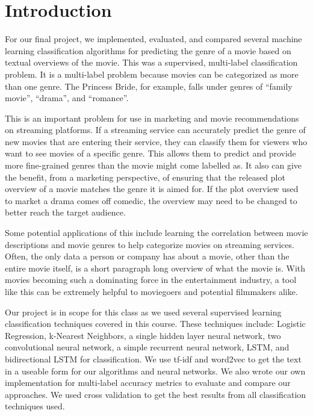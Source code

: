 \documentclass[sigconf]{acmart}
\begin{document}
%
\maketitle

\section{Introduction}
For our final project, we implemented, evaluated, and compared several machine learning classification algorithms for predicting the genre of a movie based on textual overviews of the movie.  This was a supervised, multi-label classification problem.  It is a multi-label problem because movies can be categorized as more than one genre. The Princess Bride, for example, falls under genres of ``family movie'', ``drama'', and ``romance''.  

This is an important problem for use in marketing and movie recommendations on streaming platforms. If a streaming service can accurately predict the genre of new movies that are entering their service, they can classify them for viewers who want to see movies of a specific genre. This allows them to predict and provide more fine-grained genres than the movie might come labelled as. It also can give the benefit, from a marketing perspective, of ensuring that the released plot overview of a movie matches the genre it is aimed for. If the plot overview used to market a drama comes off comedic, the overview may need to be changed to better reach the target audience. 

Some potential applications of this include learning the correlation between movie descriptions and movie genres to help categorize movies on streaming services.  Often, the only data a person or company has about a movie, other than the entire movie itself, is a short paragraph long overview of what the movie is.  With movies becoming such a dominating force in the entertainment industry, a tool like this can be extremely helpful to moviegoers and potential filmmakers alike.

Our project is in scope for this class as we used several supervised learning classification techniques covered in this course. These techniques include: Logistic Regression, k-Nearest Neighbors, a single hidden layer neural network, two convolutional neural network, a simple recurrent neural network, LSTM, and bidirectional LSTM for classification. We use tf-idf and word2vec to get the text in a useable form for our algorithms and neural networks. We also wrote our own implementation for multi-label accuracy metrics to evaluate and compare our approaches.  We used cross validation to get the best results from all classification techniques used. 
\end{document}
